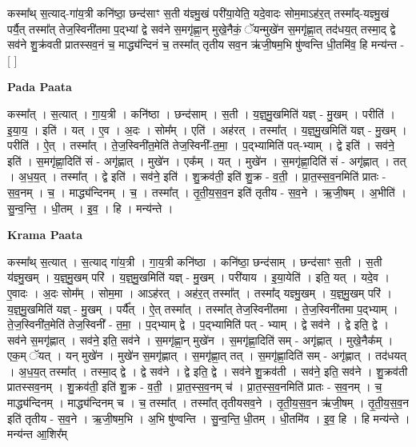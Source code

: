 \documentclass[17pt]{extarticle}
\begin{document}
कस्मा᳚थ् स॒त्याद्-गा॑य॒त्री कनि॑ष्ठा॒ छन्द॑साꣳ स॒ती य॑ज्ञ्मु॒खं परी॑या॒येति॒ यदे॒वादः सोम॒माऽह॑र॒त् तस्मा᳚द्-यज्ञ्मु॒खं पर्यै॒त् तस्मा᳚त् तेज॒स्विनी॑तमा प॒द्भ्यां द्वे सव॑ने स॒मगृ॑ह्णा॒न् मुखे॒नैकं॒ ॅयन्मुखे॑न स॒मगृ॑ह्णा॒त् तद॑धय॒त् तस्मा॒द् द्वे सव॑ने शु॒क्र॑वती प्रातस्सव॒नं च॒ माद्ध्य॑न्दिनं च॒ तस्मा᳚त् तृतीय सव॒न ऋ॑जी॒षम॒भि षु॑ण्वन्ति धी॒तमि॑व॒ हि मन्य॑न्त - [  ] \newline

\textbf{Pada Paata} \newline

कस्मा᳚त् । स॒त्यात् । गा॒य॒त्री । कनि॑ष्ठा । छन्द॑साम् । स॒ती । य॒ज्ञ्॒मु॒खमिति॑ यज्ञ् - मु॒खम् । परीति॑ । इ॒या॒य॒ । इति॑ । यत् । ए॒व । अ॒दः । सोम᳚म् । एति॑ । अह॑रत् । तस्मा᳚त् । य॒ज्ञ्॒मु॒खमिति॑ यज्ञ् - मु॒खम् । परीति॑ । ऐ॒त् । तस्मा᳚त् । ते॒ज॒स्विनी॑त॒मेति॑ तेज॒स्विनी᳚-त॒मा॒ । प॒द्भ्यामिति॑ पत्-भ्याम् । द्वे इति॑ । सव॑ने॒ इति॑ । स॒मगृ॑ह्णा॒दिति॑ सं - अगृ॑ह्णात् । मुखे॑न । एक᳚म् । यत् । मुखे॑न । स॒मगृ॑ह्णा॒दिति॑ सं - अगृ॑ह्णात् । तत् । अ॒ध॒य॒त् । तस्मा᳚त् । द्वे इति॑ । सव॑ने॒ इति॑ । शु॒क्रव॑ती॒ इति॑ शु॒क्र - व॒ती॒ । प्रा॒त॒स्स॒व॒नमिति॑ प्रातः - स॒व॒नम् । च॒ । माद्ध्य॑न्दिनम् । च॒ । तस्मा᳚त् । तृ॒ती॒य॒स॒व॒न इति॑ तृतीय - स॒व॒ने । ऋ॒जी॒षम् । अ॒भीति॑ । सु॒न्व॒न्ति॒ । धी॒तम् । इ॒व॒ । हि । मन्य॑न्ते ।  \newline


\textbf{Krama Paata} \newline

कस्मा᳚थ् स॒त्यात् । स॒त्याद् गा॑य॒त्री । गा॒य॒त्री कनि॑ष्ठा । कनि॑ष्ठा॒ छन्द॑साम् । छन्द॑साꣳ स॒ती । स॒ती य॑ज्ञ्मु॒खम् । य॒ज्ञ्॒मु॒खम् परि॑ । य॒ज्ञ्॒मु॒खमिति॑ यज्ञ् - मु॒खम् । परी॑याय । इ॒या॒येति॑ । इति॒ यत् । यदे॒व । ए॒वादः । अ॒दः सोम᳚म् । सोम॒मा । आऽह॑रत् । अह॑र॒त् तस्मा᳚त् । तस्मा᳚द् यज्ञ्मु॒खम् । य॒ज्ञ्॒मु॒खम् परि॑ । य॒ज्ञ्॒मु॒खमिति॑ यज्ञ् - मु॒खम् । पर्यै᳚त् । ऐ॒त् तस्मा᳚त् । तस्मा᳚त् तेज॒स्विनी॑तमा । ते॒ज॒स्विनी॑तमा प॒द्भ्याम् । ते॒ज॒स्विनी॑त॒मेति॑ तेज॒स्विनी᳚ - त॒मा॒ । प॒द्भ्याम् द्वे । प॒द्भ्यामिति॑ पत् - भ्याम् । द्वे सव॑ने । द्वे इति॒ द्वे । सव॑ने स॒मगृ॑ह्णात् । सव॑ने॒ इति॒ सव॑ने । स॒मगृ॑ह्णा॒न् मुखे॑न । स॒मगृ॑ह्णा॒दिति॑ सम् - अगृ॑ह्णात् । मुखे॒नैक᳚म् । एक॒म् ॅयत् । यन् मुखे॑न । मुखे॑न स॒मगृ॑ह्णात् । स॒मगृ॑ह्णा॒त् तत् । स॒मगृ॑ह्णा॒दिति॑ सम् - अगृ॑ह्णात् । तद॑धयत् । अ॒ध॒य॒त् तस्मा᳚त् । तस्मा॒द् द्वे । द्वे सव॑ने । द्वे इति॒ द्वे । सव॑ने शु॒क्रव॑ती । सव॑ने॒ इति॒ सव॑ने । शु॒क्रव॑ती प्रातस्सव॒नम् । शु॒क्रव॑ती॒ इति॑ शु॒क्र - व॒ती॒ । प्रा॒त॒स्स॒व॒नम् च॑ । प्रा॒त॒स्स॒व॒नमिति॑ प्रातः - स॒व॒नम् । च॒ माद्ध्य॑न्दिनम् । माद्ध्य॑न्दिनम् च । च॒ तस्मा᳚त् । तस्मा᳚त् तृतीयसव॒ने । तृ॒ती॒य॒स॒व॒न ऋ॑जी॒षम् । तृ॒ती॒य॒स॒व॒न इति॑ तृतीय - स॒व॒ने । ऋ॒जी॒षम॒भि । अ॒भि षु॑ण्वन्ति । सु॒न्व॒न्ति॒ धी॒तम् । धी॒तमि॑व । इ॒व॒ हि । हि मन्य॑न्ते । मन्य॑न्त आ॒शिर᳚म् \newline
\end{document}
